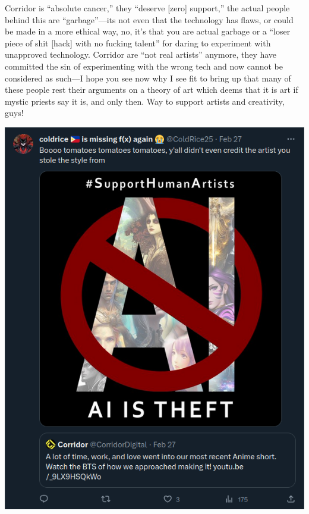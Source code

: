 \documentclass[11pt]{article}
\begin{document}
Corridor is ``absolute cancer,'' they ``deserve [zero] support,'' the actual people behind this are ``garbage''---its not even that the technology has flaws, or could be made in a more ethical way, no, it's that you are actual garbage or a ``loser piece of shit [hack] with no fucking talent'' for daring to experiment with unapproved technology. Corridor are ``not real artists'' anymore, they have committed the sin of experimenting with the wrong tech and now cannot be considered as such---I hope you see now why I see fit to bring up that many of these people rest their arguments on a theory of art which deems that it is art if mystic priests say it is, and only then. Way to support artists and creativity, guys!

\begin{center}
\includegraphics[width=.9\linewidth]{./images/bullying-corridor-not-understanding-corridor-1.png}
\end{center}
\end{document}
